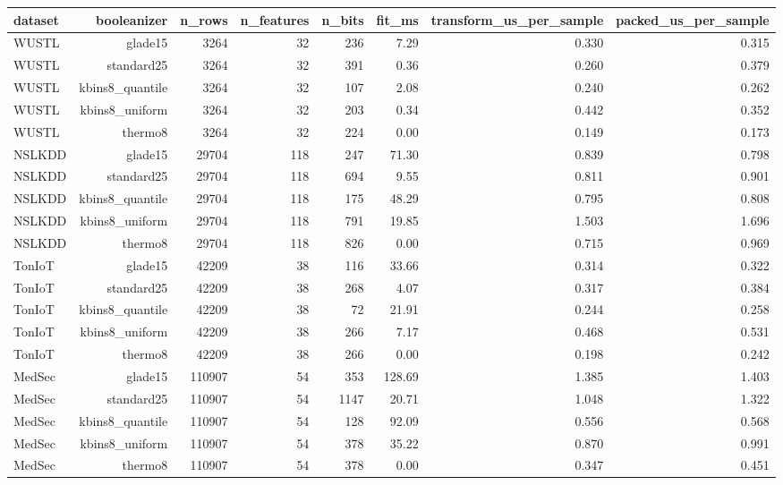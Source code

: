 \begin{tabular}{lrrrrrrr}
\toprule
dataset & booleanizer & n\_rows & n\_features & n\_bits & fit\_ms & transform\_us\_per\_sample & packed\_us\_per\_sample \\
\midrule
WUSTL & glade15 & 3264 & 32 & 236 & 7.29 & 0.330 & 0.315 \\
WUSTL & standard25 & 3264 & 32 & 391 & 0.36 & 0.260 & 0.379 \\
WUSTL & kbins8\_quantile & 3264 & 32 & 107 & 2.08 & 0.240 & 0.262 \\
WUSTL & kbins8\_uniform & 3264 & 32 & 203 & 0.34 & 0.442 & 0.352 \\
WUSTL & thermo8 & 3264 & 32 & 224 & 0.00 & 0.149 & 0.173 \\
NSLKDD & glade15 & 29704 & 118 & 247 & 71.30 & 0.839 & 0.798 \\
NSLKDD & standard25 & 29704 & 118 & 694 & 9.55 & 0.811 & 0.901 \\
NSLKDD & kbins8\_quantile & 29704 & 118 & 175 & 48.29 & 0.795 & 0.808 \\
NSLKDD & kbins8\_uniform & 29704 & 118 & 791 & 19.85 & 1.503 & 1.696 \\
NSLKDD & thermo8 & 29704 & 118 & 826 & 0.00 & 0.715 & 0.969 \\
TonIoT & glade15 & 42209 & 38 & 116 & 33.66 & 0.314 & 0.322 \\
TonIoT & standard25 & 42209 & 38 & 268 & 4.07 & 0.317 & 0.384 \\
TonIoT & kbins8\_quantile & 42209 & 38 & 72 & 21.91 & 0.244 & 0.258 \\
TonIoT & kbins8\_uniform & 42209 & 38 & 266 & 7.17 & 0.468 & 0.531 \\
TonIoT & thermo8 & 42209 & 38 & 266 & 0.00 & 0.198 & 0.242 \\
MedSec & glade15 & 110907 & 54 & 353 & 128.69 & 1.385 & 1.403 \\
MedSec & standard25 & 110907 & 54 & 1147 & 20.71 & 1.048 & 1.322 \\
MedSec & kbins8\_quantile & 110907 & 54 & 128 & 92.09 & 0.556 & 0.568 \\
MedSec & kbins8\_uniform & 110907 & 54 & 378 & 35.22 & 0.870 & 0.991 \\
MedSec & thermo8 & 110907 & 54 & 378 & 0.00 & 0.347 & 0.451 \\
\bottomrule
\end{tabular}
